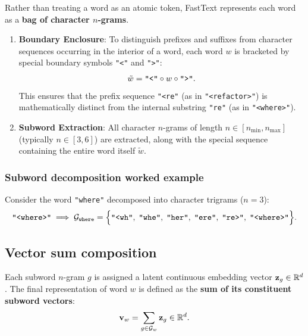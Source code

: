 \documentclass[../../../main.tex]{subfiles}
\begin{document}
Rather than treating a word as an atomic token, FastText represents each word as a \textbf{bag of character $n$-grams}.

\begin{enumerate}
    \item \textbf{Boundary Enclosure}: To distinguish prefixes and suffixes from character sequences occurring in the interior of a word, each word $w$ is bracketed by special boundary symbols \texttt{"<"} and \texttt{">"}:
    \begin{equation}
    \label{eq:boundary_enclosure}
    \tilde{w} = \text{\texttt{"<"}} \circ w \circ \text{\texttt{">"}}.
    \end{equation}
    This ensures that the prefix sequence \texttt{"<re"} (as in \texttt{"<refactor>"}) is mathematically distinct from the internal substring \texttt{"re"} (as in \texttt{"<where>"}).
    
    \item \textbf{Subword Extraction}: All character $n$-grams of length $n \in [n_{\min}, n_{\max}]$ (typically $n \in [3, 6]$) are extracted, along with the special sequence containing the entire word itself $\tilde{w}$.
\end{enumerate}

\subsubsection{Subword decomposition worked example}
Consider the word \texttt{"where"} decomposed into character trigrams ($n = 3$):
\begin{equation}
\label{eq:fasttext_subwords}
\text{\texttt{"<where>"}} \implies \mathcal{G}_{\text{\texttt{where}}} = \Big\{ \text{\texttt{"<wh"}}, \; \text{\texttt{"whe"}}, \; \text{\texttt{"her"}}, \; \text{\texttt{"ere"}}, \; \text{\texttt{"re>"}}, \; \text{\texttt{"<where>"}} \Big\}.
\end{equation}

\subsection{Vector sum composition}
\label{subsec:fasttext_composition}

Each subword $n$-gram $g$ is assigned a latent continuous embedding vector $\mathbf{z}_g \in \mathbb{R}^d$. The final representation of word $w$ is defined as the \textbf{sum of its constituent subword vectors}:
\begin{equation}
\label{eq:fasttext_sum}
\mathbf{v}_w = \sum_{g \in \mathcal{G}_w} \mathbf{z}_g \in \mathbb{R}^d.
\end{equation}
\end{document}
